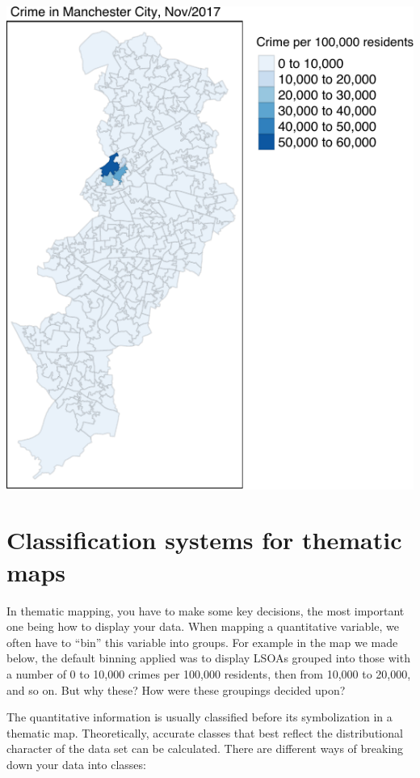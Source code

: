 \documentclass[
  krantz2]{krantz}
\begin{document}
\includegraphics{crime_mapping_files/figure-latex/unnamed-chunk-89-1.pdf}

\hypertarget{classification-systems-for-thematic-maps}{%
\section{Classification systems for thematic maps}\label{classification-systems-for-thematic-maps}}

In thematic mapping, you have to make some key decisions, the most important one being how to display your data. When mapping a quantitative variable, we often have to ``bin'' this variable into groups. For example in the map we made below, the default binning applied was to display LSOAs grouped into those with a number of 0 to 10,000 crimes per 100,000 residents, then from 10,000 to 20,000, and so on. But why these? How were these groupings decided upon?

The quantitative information is usually classified before its symbolization in a thematic map. Theoretically, accurate classes that best reflect the distributional character of the data set can be calculated. There are different ways of breaking down your data into classes:
\end{document}
